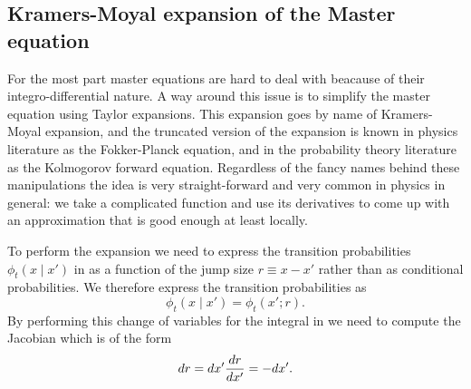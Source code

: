 \subsection{Kramers-Moyal expansion of the Master equation}

For the most part master equations are hard to deal with beacause of their
integro-differential nature. A way around this issue is to simplify the master
equation using Taylor expansions. This expansion goes by name of Kramers-Moyal
expansion, and the truncated version of the expansion is known in physics
literature as the Fokker-Planck equation, and in the probability theory
literature as the Kolmogorov forward equation. Regardless of the fancy names
behind these manipulations the idea is very straight-forward and very common in
physics in general: we take a complicated function and use its derivatives to
come up with an approximation that is good enough at least locally.

To perform the expansion we need to express the transition probabilities
$\phi_t(x \mid x')$ in  as a function of the jump size
$r \equiv x - x'$ rather than as conditional probabilities. We therefore
express the transition probabilities as
\begin{equation}
  \phi_t(x \mid x') = \phi_t(x'; r).
  \label{eq_trans_jump_size}
\end{equation}
By performing this change of variables for the integral in
 we need to compute the Jacobian which is of the form
\begin{equation}
  dr = dx' {dr \over dx'} = -dx'.
\end{equation}

